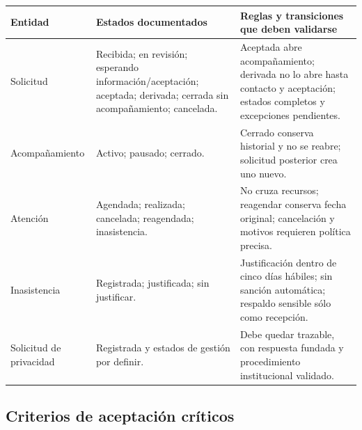 \documentclass[10pt,a4paper,oneside]{article}
\begin{document}
\small
\begin{tabularx}{\textwidth}{@{}L{0.20\textwidth}L{0.28\textwidth}Y@{}}
\toprule
\textbf{Entidad} & \textbf{Estados documentados} & \textbf{Reglas y transiciones que deben validarse}\\
\midrule
Solicitud & Recibida; en revisión; esperando información/aceptación; aceptada; derivada; cerrada sin acompañamiento; cancelada. & Aceptada abre acompañamiento; derivada no lo abre hasta contacto y aceptación; estados completos y excepciones pendientes.\\
Acompañamiento & Activo; pausado; cerrado. & Cerrado conserva historial y no se reabre; solicitud posterior crea uno nuevo.\\
Atención & Agendada; realizada; cancelada; reagendada; inasistencia. & No cruza recursos; reagendar conserva fecha original; cancelación y motivos requieren política precisa.\\
Inasistencia & Registrada; justificada; sin justificar. & Justificación dentro de cinco días hábiles; sin sanción automática; respaldo sensible sólo como recepción.\\
Solicitud de privacidad & Registrada y estados de gestión por definir. & Debe quedar trazable, con respuesta fundada y procedimiento institucional validado.\\
\bottomrule
\end{tabularx}
\normalsize

\subsection{Criterios de aceptación críticos}
\end{document}

